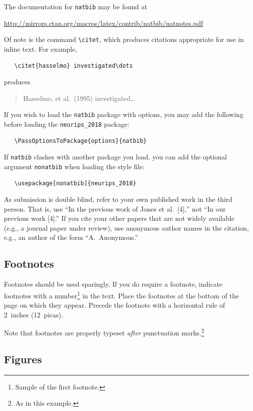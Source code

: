 \documentclass{article}
\begin{document}
The documentation for \verb+natbib+ may be found at
\begin{center}
  \url{http://mirrors.ctan.org/macros/latex/contrib/natbib/natnotes.pdf}
\end{center}
Of note is the command \verb+\citet+, which produces citations appropriate for
use in inline text.  For example,
\begin{verbatim}
   \citet{hasselmo} investigated\dots
\end{verbatim}
produces
\begin{quote}
  Hasselmo, et al.\ (1995) investigated\dots
\end{quote}

If you wish to load the \verb+natbib+ package with options, you may add the
following before loading the \verb+neurips_2018+ package:
\begin{verbatim}
   \PassOptionsToPackage{options}{natbib}
\end{verbatim}

If \verb+natbib+ clashes with another package you load, you can add the optional
argument \verb+nonatbib+ when loading the style file:
\begin{verbatim}
   \usepackage[nonatbib]{neurips_2018}
\end{verbatim}

As submission is double blind, refer to your own published work in the third
person. That is, use ``In the previous work of Jones et al.\ [4],'' not ``In our
previous work [4].'' If you cite your other papers that are not widely available
(e.g., a journal paper under review), use anonymous author names in the
citation, e.g., an author of the form ``A.\ Anonymous.''

\subsection{Footnotes}

Footnotes should be used sparingly.  If you do require a footnote, indicate
footnotes with a number\footnote{Sample of the first footnote.} in the
text. Place the footnotes at the bottom of the page on which they appear.
Precede the footnote with a horizontal rule of 2~inches (12~picas).

Note that footnotes are properly typeset \emph{after} punctuation
marks.\footnote{As in this example.}

\subsection{Figures}
\end{document}
